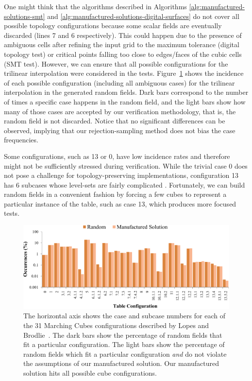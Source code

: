 One might think that the algorithms described in Algorithms
\ref{alg:manufactured-solutions-smt} and
\ref{alg:manufactured-solutions-digital-surfaces} do not cover all
possible topology configurations because 
some scalar fields are eventually discarded (lines 7 and 6
respectively). This could happen due to the presence of ambiguous cells after
refining the input grid to the maximum tolerance (digital topology test) or 
critical points falling too close to edges/faces of the cubic cells (SMT
test). However, we can ensure that all  
possible configurations for the trilinear interpolation were considered in the tests. 
Figure~\ref{fig:cubes-entries} shows the incidence of each possible
configuration (including all ambiguous cases)  
for the trilinear interpolation in the generated random fields. Dark bars correspond to the
number of times a specific case happens in the random field, and the
light bars show
how many of those cases are accepted by our verification methodology,
that is, the random field is 
not discarded. 
Notice that no significant differences can be observed, implying that
our rejection-sampling method does not bias the case frequencies.

Some configurations, such as 13 or
0, have low incidence rates and therefore might not be sufficiently stressed during verification. While the
trivial case 0 does not pose a challenge for
topology-preserving implementations, configuration 13 has 6 subcases
whose level-sets are fairly complicated \cite{lopes:tvcg:2003,
Nielson03onmarching}. Fortunately, we can build random fields in a convenient
fashion by forcing a few cubes to represent a
particular instance of the table, such as case 13, which produces 
more focused tests.

\begin{figure}[t]
\centering
\includegraphics[width=1.0\linewidth,keepaspectratio=true]
{chapter3/figures/random-sampling.pdf}
\caption{The horizontal axis shows the case and subcase numbers for
  each of the 31 Marching Cubes configurations described by Lopes and
  Brodlie~\cite{lopes:tvcg:2003}. The dark bars show the percentage of
  random fields that fit a particular configuration. The light bars
  show the percentage of random fields which fit a particular
  configuration \emph{and} do not violate the assumptions of our
  manufactured solution.  Our manufactured solution hits all possible
  cube configurations.}
\label{fig:cubes-entries}
\end{figure}


